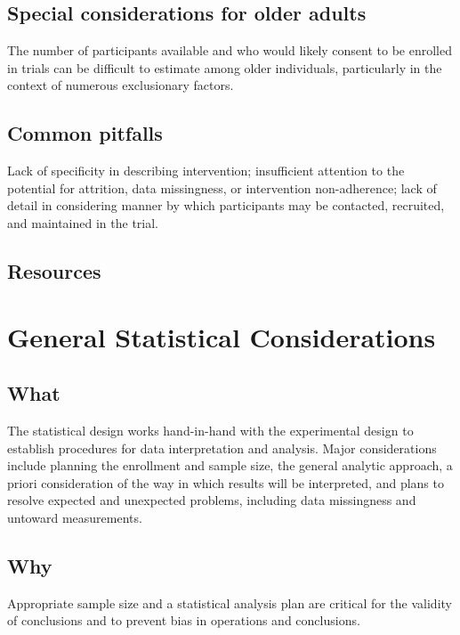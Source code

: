 \documentclass[]{book}
\theoremstyle{definition}
\theoremstyle{definition}
\theoremstyle{definition}
\theoremstyle{remark}
\begin{document}
\subsection{Special considerations for older
adults}\label{special-considerations-for-older-adults}

The number of participants available and who would likely consent to be
enrolled in trials can be difficult to estimate among older individuals,
particularly in the context of numerous exclusionary factors.

\subsection{Common pitfalls}\label{common-pitfalls}

Lack of specificity in describing intervention; insufficient attention
to the potential for attrition, data missingness, or intervention
non-adherence; lack of detail in considering manner by which
participants may be contacted, recruited, and maintained in the trial.

\subsection{Resources}\label{resources}

\section{General Statistical
Considerations}\label{general-statistical-considerations}

\subsection{What}\label{what-2}

The statistical design works hand-in-hand with the experimental design
to establish procedures for data interpretation and analysis. Major
considerations include planning the enrollment and sample size, the
general analytic approach, a priori consideration of the way in which
results will be interpreted, and plans to resolve expected and
unexpected problems, including data missingness and untoward
measurements.

\subsection{Why}\label{why-2}

Appropriate sample size and a statistical analysis plan are critical for
the validity of conclusions and to prevent bias in operations and
conclusions.
\end{document}
